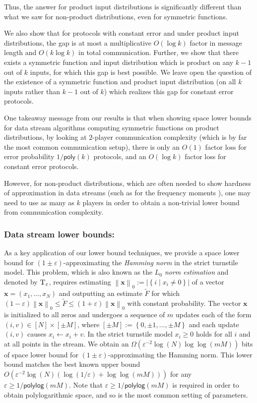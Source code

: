 \documentclass{toc}
\newcommand{\set}[1]{{\left \{{#1} \right \}}}
\newcommand{\norm}[1]{{\left\| {#1} \right \|}}
\newcommand{\st}{\;|\;}
\newcommand{\poly}{\mathsf{poly}}
\newcommand{\polylog}{\ensuremath{\mathsf{polylog}}}
\newcommand{\gap}{\ensuremath{\varepsilon}}
\newcommand{\bigo}[1]{\ensuremath{{{O} \left( {#1} \right)}}}
\newcommand{\bigomega}[1]{\ensuremath{{\Omega \left( {#1} \right)}}}
\newcommand{\eqdef}{\ensuremath{:=}}
\newcommand{\hest}{ \textsc{T} }
\begin{document}
Thus, the answer for product input distributions is significantly different than what we saw for non-product distributions, even for symmetric functions. 

We also show that for protocols with constant error and under product input distributions, the gap is at most a multiplicative $O(\log k)$ factor in message length and $O(k \log k)$ in total communication. Further, we show that there exists a symmetric function and input distribution which is product on any $k-1$ out of $k$ inputs, for which this gap is best possible. We leave open the question of the existence of a symmetric function and product input distribution (on all $k$ inputs rather than $k-1$ out of $k$) which realizes this gap for constant error protocols.

One takeaway message from our results is that when showing space lower bounds for data stream algorithms computing symmetric functions on product distributions, by looking at $2$-player communication complexity (which is by far the most common communication setup), there is only an $O(1)$ factor loss for error probability $1/\poly(k)$ protocols, and an $\bigo{\log k}$ factor loss for constant error protocols. 

However, for non-product distributions, which are often needed to show hardness of approximation in data streams (such as for the frequency moments \cite{BarYossef:2004eya}), one may need to use as many as $k$ players in order to obtain a non-trivial lower bound from communication complexity. 

\subsubsection{Data stream lower bounds:}
\label{para:Hamming estimation}
As a key application of our lower bound techniques, we provide a space
lower bound for $(1\pm\gap)$-approximating the \emph{Hamming norm} in the strict turnstile model.
This problem, which is also known as the \emph{$L_0$ norm estimation} and denoted by $\hest_\gap$, requires estimating $\norm{\mathbf{x}}_0  \eqdef |\set{i \st x_i \ne 0}|$ of a vector $\mathbf{x} = (x_1, \ldots, x_N)$ and outputting an estimate $\widetilde{F}$ for which $(1-\gap)\norm{\mathbf{x}}_0\le \widetilde{F} \le (1+\gap)\norm{\mathbf{x}}_0 $ with constant probability. 
The vector $\mathbf{x}$ is initialized to all zeros and undergoes a sequence of $m$ updates each of the form 
$(i,v)\in [N]\times [\pm M]$, 
where $[\pm M]\eqdef \set{0,\pm 1,\dots,\pm M}$ and each update $(i,v)$ causes $x_i\gets x_i+v$.
In the strict turnstile model $x_i \geq 0$ holds for all $i$ and at all points in the stream.
%
We obtain an $\bigomega{\gap^{-2}\log(N)\log\log(mM)}$ bits of space lower bound for  $(1\pm\gap)$-approximating the {Hamming norm}.
This lower bound matches the best known upper bound $\bigo{\gap^{-2}\log(N)\left(\log(1/\gap)+\log \log (mM)\right)}$ \cite{KNW10} for any $\gap\ge 1/\polylog(mM)$. Note that $\gap \geq 1/\polylog(mM)$ is required in order to obtain polylogarithmic space, and so is the most common setting of parameters.
\end{document}
